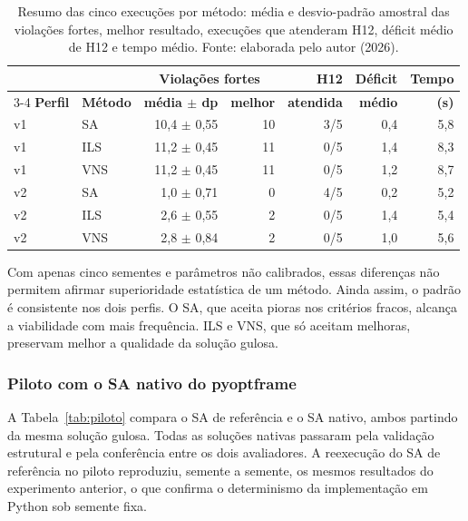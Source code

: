 \begin{table}[htbp]
  \centering
  \caption{Resumo das cinco execuções por método: média e desvio-padrão amostral das violações fortes, melhor resultado, execuções que atenderam H12, déficit médio de H12 e tempo médio. Fonte: elaborada pelo autor (2026).}
  \label{tab:sementes}
  \small
  \begin{tabular}{llrrrrr}
    \toprule
    & & \multicolumn{2}{c}{\textbf{Violações fortes}} & \textbf{H12} & \textbf{Déficit} & \textbf{Tempo} \\
    \cmidrule(lr){3-4}
    \textbf{Perfil} & \textbf{Método} & \textbf{média $\pm$ dp} & \textbf{melhor} & \textbf{atendida} & \textbf{médio} & \textbf{(s)} \\
    \midrule
    v1 & SA  & 10,4 $\pm$ 0,55 & 10 & 3/5 & 0,4 & 5,8 \\
    v1 & ILS & 11,2 $\pm$ 0,45 & 11 & 0/5 & 1,4 & 8,3 \\
    v1 & VNS & 11,2 $\pm$ 0,45 & 11 & 0/5 & 1,2 & 8,7 \\
    \midrule
    v2 & SA  & 1,0 $\pm$ 0,71 & 0 & 4/5 & 0,2 & 5,2 \\
    v2 & ILS & 2,6 $\pm$ 0,55 & 2 & 0/5 & 1,4 & 5,4 \\
    v2 & VNS & 2,8 $\pm$ 0,84 & 2 & 0/5 & 1,0 & 5,6 \\
    \bottomrule
  \end{tabular}
\end{table}

Com apenas cinco sementes e parâmetros não calibrados, essas diferenças não permitem afirmar superioridade estatística de um método. Ainda assim, o padrão é consistente nos dois perfis. O SA, que aceita pioras nos critérios fracos, alcança a viabilidade com mais frequência. ILS e VNS, que só aceitam melhoras, preservam melhor a qualidade da solução gulosa. 

\subsubsection{Piloto com o SA nativo do pyoptframe}

A Tabela~\ref{tab:piloto} compara o SA de referência e o SA nativo, ambos partindo da mesma solução gulosa. Todas as soluções nativas passaram pela validação estrutural e pela conferência entre os dois avaliadores. A reexecução do SA de referência no piloto reproduziu, semente a semente, os mesmos resultados do experimento anterior, o que confirma o determinismo da implementação em Python sob semente fixa.

